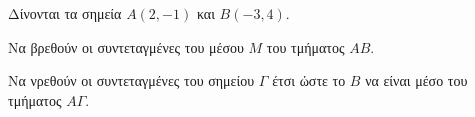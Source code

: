 Δίνονται τα σημεία $ A(2,-1) $ και $ B(-3,4) $.
\begin{alist}
\item Να βρεθούν οι συντεταγμένες του μέσου $ M $ του τμήματος $ AB $.
\item Να νρεθούν οι συντεταγμένες του σημείου $ \varGamma $ έτσι ώστε το $ B $ να είναι μέσο του τμήματος $ A\varGamma $.
\end{alist}
